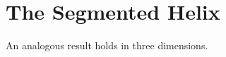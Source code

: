 \documentclass{svproc}
\begin{document}







\section{The Segmented Helix}

An analogous result holds in three dimensions.
\end{document}
